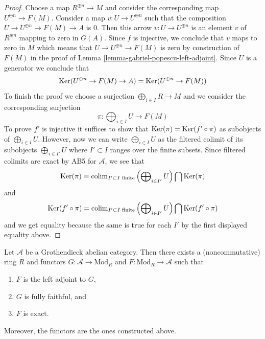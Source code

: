 \begin{proof}
Choose a map $R^{\oplus n} \to M$ and consider the corresponding map
$U^{\oplus n} \to F(M)$. Consider a map $v : U \to U^{\oplus n}$
such that the composition $U \to U^{\oplus n} \to F(M) \to A$ is $0$.
Then this arrow $v : U \to U^{\oplus n}$ is an element
$v$ of $R^{\oplus n}$ mapping to zero in $G(A)$. Since $f$ is injective,
we conclude that $v$ maps to zero in $M$ which means that
$U \to U^{\oplus n} \to F(M)$ is zero by construction of $F(M)$
in the proof of Lemma \ref{lemma-gabriel-popescu-left-adjoint}.
Since $U$ is a generator we conclude that
$$
\mathop{\mathrm{Ker}}(U^{\oplus n} \to F(M) \to A) = \mathop{\mathrm{Ker}}(U^{\oplus n} \to F(M))
$$
To finish the proof we choose a surjection $\bigoplus_{i \in I} R \to M$
and we consider the corresponding surjection
$$
\pi : \bigoplus\nolimits_{i \in I} U \longrightarrow F(M)
$$
To prove $f'$ is injective it suffices to show that
$\mathop{\mathrm{Ker}}(\pi) = \mathop{\mathrm{Ker}}(f' \circ \pi)$ as subobjects of $\bigoplus_{i \in I} U$.
However, now we can write $\bigoplus_{i \in I} U$ as the filtered colimit
of its subobjects $\bigoplus_{i \in I'} U$ where $I' \subset I$
ranges over the finite subsets. Since filtered colimits are
exact by AB5 for $\mathcal{A}$, we see that
$$
\mathop{\mathrm{Ker}}(\pi) =
\mathop{\mathrm{colim}}\nolimits_{I' \subset I\text{ finite}}
\left(\bigoplus\nolimits_{i \in I'} U\right)
\bigcap \mathop{\mathrm{Ker}}(\pi)
$$
and
$$
\mathop{\mathrm{Ker}}(f' \circ \pi) =
\mathop{\mathrm{colim}}\nolimits_{I' \subset I\text{ finite}}
\left(\bigoplus\nolimits_{i \in I'} U\right)
\bigcap \mathop{\mathrm{Ker}}(f' \circ \pi)
$$
and we get equality because the same is true for each $I'$ by
the first displayed equality above.
\end{proof}

\begin{theorem}
\label{theorem-gabriel-popescu}
Let $\mathcal{A}$ be a Grothendieck abelian category. Then there exists
a (noncommutative) ring $R$ and functors $G : \mathcal{A} \to \text{Mod}_R$
and $F : \text{Mod}_R \to \mathcal{A}$ such that
\begin{enumerate}
\item $F$ is the left adjoint to $G$,
\item $G$ is fully faithful, and
\item $F$ is exact.
\end{enumerate}
Moreover, the functors are the ones constructed above.
\end{theorem}


